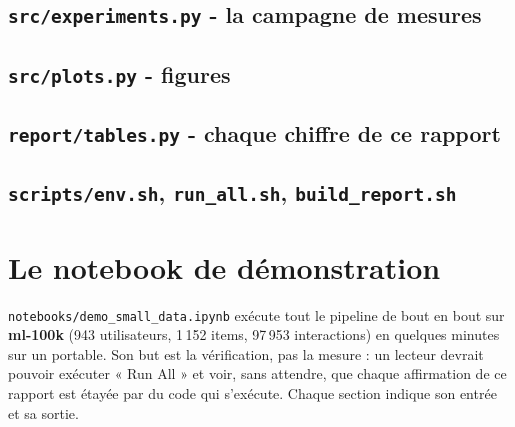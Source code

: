 \subsection{\texttt{src/experiments.py} - la campagne de mesures}


\subsection{\texttt{src/plots.py} - figures}


\subsection{\texttt{report/tables.py} - chaque chiffre de ce rapport}


\subsection{\texttt{scripts/env.sh}, \texttt{run\_all.sh}, \texttt{build\_report.sh}}




\section{Le notebook de démonstration}\label{app:nb}

\texttt{notebooks/demo\_small\_data.ipynb} exécute tout le pipeline de bout en bout
sur \textbf{ml-100k} (943 utilisateurs, 1\,152 items, 97\,953 interactions) en
quelques minutes sur un portable. Son but est la vérification, pas la mesure : un
lecteur devrait pouvoir exécuter « Run All » et voir, sans attendre, que chaque
affirmation de ce rapport est étayée par du code qui s'exécute. Chaque section
indique son entrée et sa sortie.

